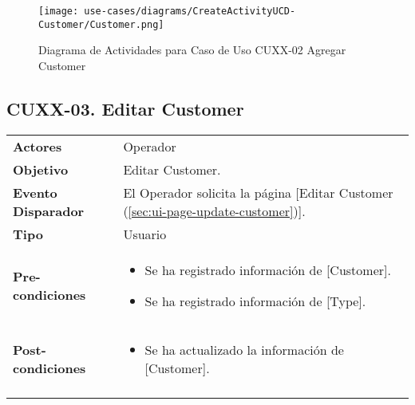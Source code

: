 	\begin{figure}[H]
		\begin{center}
			\label{tab:activity-create-ucd-entity-customer}
			\texttt{[image: use-cases/diagrams/CreateActivityUCD-Customer/Customer.png]}
			\caption{Diagrama de Actividades para Caso de Uso CUXX-02 Agregar Customer}	
	    \end{center}
	\end{figure}
			
	
	\clearpage
	\subsection{CUXX-03. Editar Customer} \label{sec:cu-update-Customer}
	
	\begin{tabular}{ p{3.5cm} p{11.5cm} }
		\textbf{Actores} & Operador\\
		\textbf{Objetivo} & Editar Customer.\\
		\textbf{Evento Disparador} & El Operador solicita la p\'agina [Editar Customer (\ref{sec:ui-page-update-customer})].\\
		\textbf{Tipo} & Usuario\\
		\textbf{Pre-condiciones} &
			\begin{minipage}[t]{0.6\textwidth}
			\begin{itemize}[noitemsep,nolistsep]
			\setlength{\itemindent}{-.5cm}
				\item Se ha registrado informaci\'on de [Customer].
				\item Se ha registrado informaci\'on de [Type].
			\end{itemize}
			\end{minipage} \\
		\textbf{Post-condiciones} &
			\begin{minipage}[t]{0.6\textwidth}
			\begin{itemize}[noitemsep,nolistsep]
			\setlength{\itemindent}{-.5cm}
				\item Se ha actualizado la informaci\'on de [Customer].
			\end{itemize}
			\end{minipage} \\
		\\
	\end{tabular}
	
